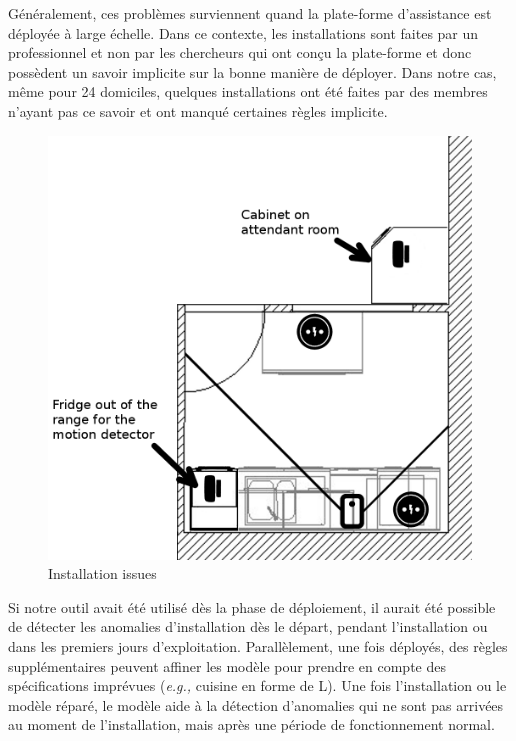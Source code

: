 Généralement, ces problèmes surviennent quand la plate-forme d'assistance est déployée à large échelle. Dans ce contexte, les installations sont faites par un professionnel et non par les chercheurs qui ont conçu la plate-forme et donc possèdent un savoir implicite sur la bonne manière de déployer. Dans notre cas, même pour 24 domiciles, quelques installations ont été faites par des membres n'ayant pas ce savoir et ont manqué certaines règles implicite.

\begin{figure}[!h]
  \centering
      \includegraphics[scale=0.2]{gfx/map.png}
      \caption{Installation issues}
      \label{fig:map}
\end{figure}

Si notre outil avait été utilisé dès la phase de déploiement, il aurait été possible de détecter les anomalies d'installation dès le départ, pendant l'installation ou dans les premiers jours d'exploitation. Parallèlement, une fois déployés, des règles supplémentaires peuvent affiner les modèle pour prendre en compte des spécifications imprévues ({\em e.g.,} cuisine en forme de L). Une fois l'installation ou le modèle réparé, le modèle aide à la détection d'anomalies qui ne sont pas arrivées au moment de l'installation, mais après une période de fonctionnement normal.

